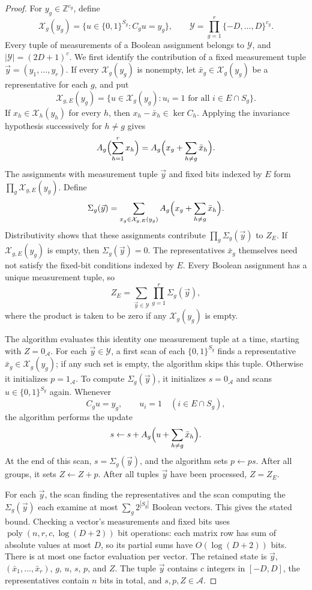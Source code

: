 \documentclass[11pt,reqno]{amsart}
\numberwithin{equation}{section}
\theoremstyle{definition}\newtheorem{definition}[theorem]{Definition}
\theoremstyle{remark}\newtheorem{remark}[theorem]{Remark}
\newcommand{\poly}{\operatorname{poly}}
\begin{document}
\begin{proof}
For $y_g\in\mathbb Z^{c_g}$, define
\[
 \mathcal X_g(y_g)=\{u\in\{0,1\}^{S_g}:C_gu=y_g\},
 \qquad
 \mathcal Y=\prod_{g=1}^r\{-D,\ldots,D\}^{c_g}.
\]
Every tuple of measurements of a Boolean assignment belongs to
$\mathcal Y$, and $|\mathcal Y|=(2D+1)^c$.
We first identify the contribution of a fixed measurement tuple
$\vec y=(y_1,\ldots,y_r)$. If every $\mathcal X_g(y_g)$ is nonempty,
let $\bar x_g\in\mathcal X_g(y_g)$ be a representative for each $g$,
and put
\[
 \mathcal X_{g,E}(y_g)=
 \{u\in\mathcal X_g(y_g):u_i=1\text{ for all }i\in E\cap S_g\}.
\]
If $x_h\in\mathcal X_h(y_h)$ for every $h$, then
$x_h-\bar x_h\in\ker C_h$. Applying the invariance hypothesis
successively for $h\ne g$ gives
\[
 A_g\Bigl(\sum_{h=1}^r x_h\Bigr)
 =A_g\Bigl(x_g+\sum_{h\ne g}\bar x_h\Bigr).
\]
The assignments with measurement tuple $\vec y$ and fixed bits indexed
by $E$ form $\prod_g\mathcal X_{g,E}(y_g)$. Define
\begin{equation}\label{eq:group-sum}
 \Sigma_g(\vec y)=\sum_{x_g\in\mathcal X_{g,E}(y_g)}
       A_g\Bigl(x_g+\sum_{h\ne g}\bar x_h\Bigr).
\end{equation}
Distributivity shows that these assignments contribute
$\prod_g\Sigma_g(\vec y)$ to $Z_E$. If $\mathcal X_{g,E}(y_g)$ is empty,
then $\Sigma_g(\vec y)=0$. The representatives $\bar x_g$ themselves
need not satisfy the fixed-bit conditions indexed by $E$.
Every Boolean assignment has a unique measurement tuple, so
\[
 Z_E=\sum_{\vec y\in\mathcal Y}\prod_{g=1}^r\Sigma_g(\vec y),
\]
where the product is taken to be zero if any $\mathcal X_g(y_g)$
is empty.

The algorithm evaluates this identity one measurement tuple at a
time, starting with $Z=0_{\mathcal A}$. For each $\vec y\in\mathcal Y$,
a first scan of each $\{0,1\}^{S_g}$ finds a representative
$\bar x_g\in\mathcal X_g(y_g)$; if any such set is empty, the
algorithm skips this tuple. Otherwise it initializes
$p=1_{\mathcal A}$. To compute $\Sigma_g(\vec y)$, it initializes
$s=0_{\mathcal A}$ and scans $u\in\{0,1\}^{S_g}$ again. Whenever
\[
 C_gu=y_g,\qquad u_i=1\quad(i\in E\cap S_g),
\]
the algorithm performs the update
\[
 s\leftarrow s+A_g\Bigl(u+\sum_{h\ne g}\bar x_h\Bigr).
\]
At the end of this scan, $s=\Sigma_g(\vec y)$, and the algorithm sets
$p\leftarrow ps$. After all groups, it sets $Z\leftarrow Z+p$.
After all tuples $\vec y$ have been processed, $Z=Z_E$.

For each $\vec y$, the scan finding the representatives and the scan
computing the $\Sigma_g(\vec y)$ each examine at most
$\sum_g2^{|S_g|}$ Boolean vectors. This gives the stated bound.
Checking a vector's measurements and fixed bits uses
$\poly(n,r,c,\log(D+2))$ bit operations: each matrix row has sum of
absolute values at most $D$, so its partial sums have
$O(\log(D+2))$ bits. There is at most one factor evaluation per vector.
The retained state is $\vec y$, $(\bar x_1,\ldots,\bar x_r)$, $g$, $u$,
$s$, $p$, and $Z$. The tuple $\vec y$ contains $c$ integers in $[-D,D]$,
the representatives contain $n$ bits in total, and $s,p,Z\in\mathcal A$.
\end{proof}
\end{document}
